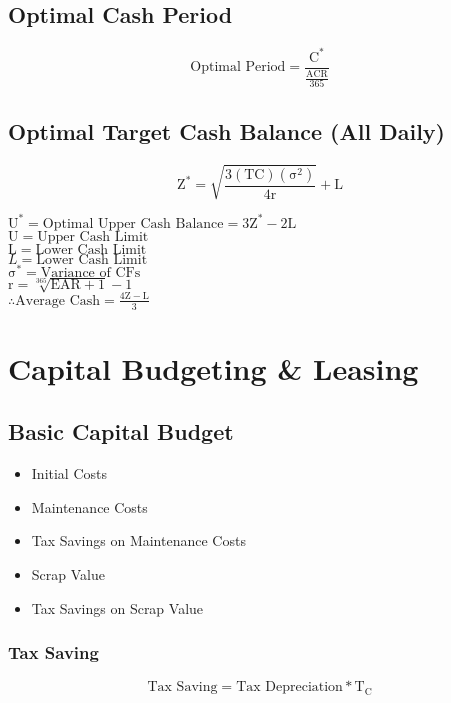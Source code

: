 \documentclass[11pt, english]{article}
\begin{document}
	\subsection{Optimal Cash Period}

	$$\mathrm{\textrm{Optimal Period}=\frac{C^*}{\frac{ACR}{365}}}$$

	\subsection{Optimal Target Cash Balance (All Daily)}

	$$\mathrm{Z^*=\sqrt{\frac{3(TC)(\sigma^2)}{4r}}+L}$$

	$\mathrm{U^*=\textrm{Optimal Upper Cash Balance}=3Z^*-2L}$\\
	$\mathrm{U=\textrm{Upper Cash Limit}}$\\
	$\mathrm{L=\textrm{Lower Cash Limit}}$\\
	$\mathrm{}L=\textrm{Lower Cash Limit}$\\
	$\mathrm{\sigma^*=\textrm{Variance of CFs}}$\\
	$\mathrm{r=\sqrt[365]{EAR+1}-1}$\\
	$\mathrm{\therefore \textrm{Average Cash}=\frac{4Z-L}{3}}$

\newpage

\section{Capital Budgeting \& Leasing}

	\subsection{Basic Capital Budget}

	\begin{itemize}
		\item Initial Costs
		\item Maintenance Costs
		\item Tax Savings on Maintenance Costs
		\item Scrap Value
		\item Tax Savings on Scrap Value
	\end{itemize}

		\subsubsection{Tax Saving}

	$$\mathrm{\textrm{Tax Saving}=\textrm{Tax Depreciation}*T_C }$$
\end{document}
